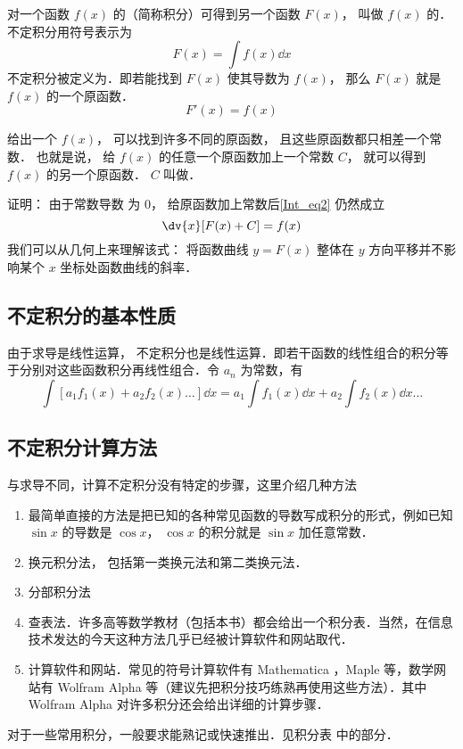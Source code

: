 

对一个函数 $f(x)$ 的（简称积分）可得到另一个函数 $F(x)$， 叫做 $f(x)$ 的．不定积分用符号表示为
\begin{equation}\label{Int_eq1}
F(x) = \int f(x) \dd{x} 
\end{equation}
不定积分被定义为．即若能找到 $F(x)$ 使其导数为 $f(x)$， 那么 $F(x)$ 就是  $f(x)$ 的一个原函数．
\begin{equation}\label{Int_eq2}
F'(x) = f(x)
\end{equation}

给出一个 $f(x)$， 可以找到许多不同的原函数， 且这些原函数都只相差一个常数． 也就是说， 给 $f(x)$ 的任意一个原函数加上一个常数 $C$， 就可以得到 $f(x)$ 的另一个原函数． $C$ 叫做．

证明： 由于常数导数%
为 $0$， 给原函数加上常数后\autoref{Int_eq2} 仍然成立
\begin{equation}\label{Int_eq3}
\dv{x} [F(x) + C] = f(x)
\end{equation}
我们可以从几何上来理解该式： 将函数曲线 $y = F(x)$ 整体在 $y$ 方向平移并不影响某个 $x$ 坐标处函数曲线的斜率．

\subsection{不定积分的基本性质}%

由于求导是线性运算，%
不定积分也是线性运算．即若干函数的线性组合的积分等于分别对这些函数积分再线性组合．令 $a_n$ 为常数，有
\begin{equation}\label{Int_eq4}
\int [a_1 f_1(x) + a_2 f_2(x)\dots] \dd{x}  = a_1 \int f_1(x) \dd{x} + a_2 \int f_2(x) \dd{x} \dots
\end{equation}

\subsection{不定积分计算方法}
与求导不同，计算不定积分没有特定的步骤，这里介绍几种方法
\begin{enumerate}
\item 最简单直接的方法是把已知的各种常见函数的导数写成积分的形式，例如已知 $\sin x$ 的导数是 $\cos x$， $\cos x$ 的积分就是 $\sin x$ 加任意常数．
\item 换元积分法， 包括第一类换元法和第二类换元法．

\item 分部积分法

\item 查表法．许多高等数学教材（包括本书）都会给出一个积分表．当然，在信息技术发达的今天这种方法几乎已经被计算软件和网站取代．

\item 计算软件和网站．常见的符号计算软件有 Mathematica %
，Maple 等，数学网站有 Wolfram Alpha %
等（建议先把积分技巧练熟再使用这些方法）．其中 Wolfram Alpha 对许多积分还会给出详细的计算步骤．
 \end{enumerate}

对于一些常用积分，一般要求能熟记或快速推出．见积分表 中的部分．%



